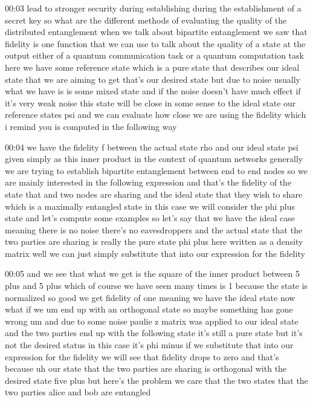 00:03
lead to stronger security during establishing
during the establishment of a secret key so what are the different methods of
evaluating the quality of the distributed entanglement when we talk
about bipartite entanglement we saw that fidelity is one function
that we can use to talk about the quality of a state at the output either of a
quantum communication task or a quantum computation task
here we have some reference state which is a pure state that describes our ideal
state that we are aiming to get that's our desired state
but due to noise usually what we have is is some mixed state and if the noise
doesn't have much effect if it's very weak noise
this state will be close in some sense to the ideal state our reference states
psi and we can evaluate how close we are using the fidelity
which i remind you is computed in the following way

00:04
we have the fidelity f between the actual state rho
and our ideal state psi given simply as this inner product
in the context of quantum networks generally we are trying to establish
bipartite entanglement between end to end nodes
so we are mainly interested in the following expression and that's the fidelity
of the state that and two nodes are sharing
and the ideal state that they wish to share which is
a maximally entangled state in this case we will consider the phi plus state
and let's compute some examples so let's say that we have the ideal case
meaning there is no noise there's no eavesdroppers and the actual state
that the two parties are sharing is really the pure state
phi plus here written as a density matrix
well we can just simply substitute that into our expression for the fidelity

00:05
and we see that what we get is the square of the inner product between 5
plus and 5 plus which of course we have seen many times
is 1 because the state is normalized so good we get
fidelity of one meaning we have the ideal state now
what if we um end up with an orthogonal state
so maybe something has gone wrong um and due to some noise paulie z
matrix was applied to our ideal state and the two parties end up with the
following state it's still a pure state but it's not the desired status in this
case it's phi minus if we substitute that into our expression for the fidelity
we will see that fidelity drops to zero and that's because
uh our state that the two parties are sharing is orthogonal
with the desired state five plus but here's the problem we care that the
two states that the two parties alice and bob are entangled

